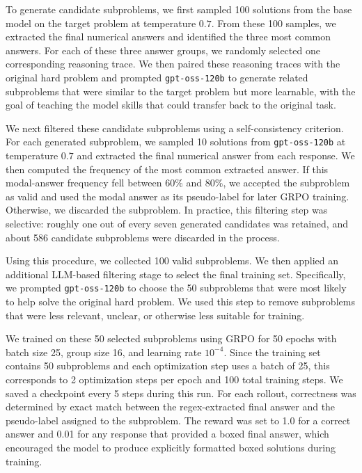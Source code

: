 \documentclass{article}
\begin{document}
To generate candidate subproblems, we first sampled 100 solutions from the base model on the target problem at temperature $0.7$. From these 100 samples, we extracted the final numerical answers and identified the three most common answers. For each of these three answer groups, we randomly selected one corresponding reasoning trace. We then paired these reasoning traces with the original hard problem and prompted \texttt{gpt-oss-120b} to generate related subproblems that were similar to the target problem but more learnable, with the goal of teaching the model skills that could transfer back to the original task.

We next filtered these candidate subproblems using a self-consistency criterion. For each generated subproblem, we sampled 10 solutions from \texttt{gpt-oss-120b} at temperature $0.7$ and extracted the final numerical answer from each response. We then computed the frequency of the most common extracted answer. If this modal-answer frequency fell between $60\%$ and $80\%$, we accepted the subproblem as valid and used the modal answer as its pseudo-label for later GRPO training. Otherwise, we discarded the subproblem. In practice, this filtering step was selective: roughly one out of every seven generated candidates was retained, and about 586 candidate subproblems were discarded in the process.

Using this procedure, we collected 100 valid subproblems. We then applied an additional LLM-based filtering stage to select the final training set. Specifically, we prompted \texttt{gpt-oss-120b} to choose the 50 subproblems that were most likely to help solve the original hard problem. We used this step to remove subproblems that were less relevant, unclear, or otherwise less suitable for training.

We trained on these 50 selected subproblems using GRPO for 50 epochs with batch size 25, group size 16, and learning rate $10^{-4}$. Since the training set contains 50 subproblems and each optimization step uses a batch of 25, this corresponds to 2 optimization steps per epoch and 100 total training steps. We saved a checkpoint every 5 steps during this run. For each rollout, correctness was determined by exact match between the regex-extracted final answer and the pseudo-label assigned to the subproblem. The reward was set to 1.0 for a correct answer and 0.01 for any response that provided a boxed final answer, which encouraged the model to produce explicitly formatted boxed solutions during training.
\end{document}
